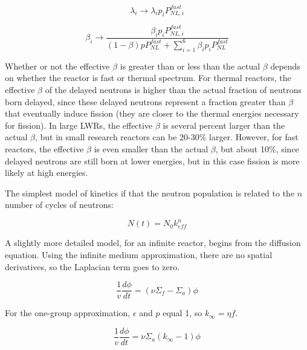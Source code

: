 \documentclass[10pt]{article}
\begin{document}
\begin{flushleft}
\begin{equation}
\label{eq:ModifiedKineticsParameters_Lambda1}
\lambda_i \rightarrow \lambda_i p_i P_{NL,i}^{fast}
\end{equation}

\begin{equation}
\label{eq:ModifiedKineticsParameters_Beta2}
\beta_i \rightarrow \frac{\beta_i p_i P_{NL,i}^{fast}}{(1-\beta)pP_{NL}^{fast}+\sum_{i=1}^{6}\beta_i p_i P_{NL}^{fast}}
\end{equation}

Whether or not the effective \(\beta\) is greater than or less than the actual \(\beta\) depends on whether the reactor is fast or thermal spectrum. For thermal reactors, the effective \(\beta\) of the delayed neutrons is higher than the actual fraction of neutrons born delayed, since these delayed neutrons represent a fraction greater than \(\beta\) that eventually induce fission (they are closer to the thermal energies necessary for fission). In large LWRs, the effective \(\beta\) is several percent larger than the actual \(\beta\), but in small research reactors can be 20-30\% larger. However, for fast reactors, the effective \(\beta\) is even smaller than the actual \(\beta\), but about 10\%, since delayed neutrons are still born at lower energies, but in this case fission is more likely at high energies.

The simplest model of kinetics if that the neutron population is related to the \(n\) number of cycles of neutrons:

\begin{equation}
\label{eq:SimplestKineticsModel}
N(t)=N_0k_{eff}^{n}
\end{equation}

A slightly more detailed model, for an infinite reactor, begins from the diffusion equation. Using the infinite medium approximation, there are no spatial derivatives, so the Laplacian term goes to zero. 

\begin{equation}
\label{eq:InfiniteReactorKinetics1}
\frac{1}{v}\frac{d\phi}{dt}=(\nu\Sigma_f-\Sigma_a)\phi
\end{equation}

For the one-group approximation, \(\epsilon\) and \(p\) equal 1, so \(k_\infty=\eta f\).

\begin{equation}
\label{eq:InfiniteReactorKinetics2}
\frac{1}{v}\frac{d\phi}{dt}=\nu\Sigma_a(k_\infty-1)\phi
\end{equation}


\end{flushleft}
\end{document}
